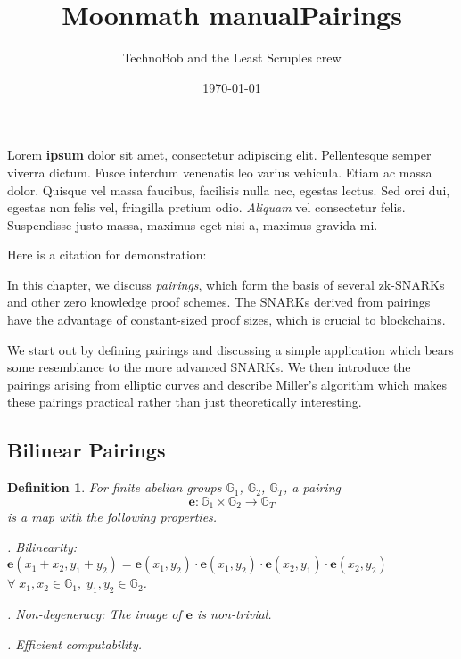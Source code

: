 \documentclass[a4paper, 11pt]{scrreprt}
\title{Moonmath manual}
\author{TechnoBob and the Least Scruples crew}
\date{\today}
\newtheorem{Def}{Definition}[section]
\numberwithin{equation}{section}
\newcommand{\lra}{\longrightarrow}
\newcommand{\mb}{\mathbb}
\theoremstyle{plain}
\begin{document}
\maketitle

Lorem \textbf{ipsum} dolor sit amet, consectetur adipiscing elit. Pellentesque semper viverra dictum.  Fusce interdum venenatis leo varius vehicula. Etiam ac massa dolor. Quisque vel massa faucibus, facilisis nulla nec, egestas lectus. Sed orci dui, egestas non felis vel, fringilla pretium odio. \textit{Aliquam} vel consectetur felis. Suspendisse justo massa, maximus eget nisi a, maximus gravida mi.

Here is a citation for demonstration: \cite{lamport1982the}


















\title{Pairings}
\author{}
\date{}
 
\maketitle


In this chapter, we discuss \textit{pairings}, which form the basis of several zk-SNARKs and other zero knowledge proof schemes. The SNARKs derived from pairings have the advantage of constant-sized proof sizes, which is crucial to blockchains. 

We start out by defining pairings and discussing a simple application which bears some resemblance to the more advanced SNARKs. We then introduce the pairings arising from elliptic curves and describe Miller's algorithm which makes these pairings practical rather than just theoretically interesting.


\subsection{\fontsize{11}{11}\selectfont Bilinear Pairings}


\begin{Def} \normalfont For finite abelian groups $\mb{G}_1$, $\mb{G}_2$, $\mb{G}_T$, a \textit{pairing} $$\mathbf{e}:\mb{G}_1\times \mb{G}_2 \lra \mb{G}_T$$ is a map with the following properties.

. Bilinearity: $\mathbf{e}(x_1+x_2,y_1+y_2) = \mathbf{e}(x_1, y_2)\cdot\mathbf{e}(x_1, y_2)\cdot\mathbf{e}(x_2, y_1)\cdot\mathbf{e}(x_2, y_2)$\\ $\forall\; x_1,x_2\in \mb{G}_1,\; y_1,y_2\in \mb{G}_2$.

. Non-degeneracy: The image of $\mathbf{e}$ is non-trivial.

. Efficient computability.\end{Def}
\end{document}
